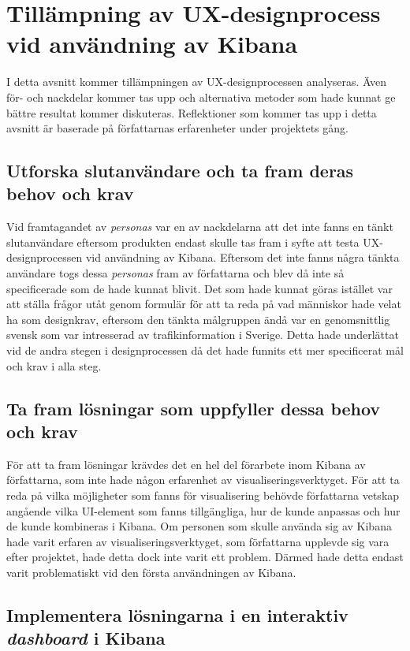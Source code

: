 \documentclass[12pt]{kththesis}
\begin{document}
\section{Tillämpning av UX-designprocess vid användning av Kibana} 
I detta avsnitt kommer tillämpningen av UX-designprocessen analyseras. Även för- och nackdelar kommer tas upp och alternativa metoder som hade kunnat ge bättre resultat kommer diskuteras.  Reflektioner som kommer tas upp i detta avsnitt är baserade på författarnas erfarenheter under projektets gång.

\subsection{Utforska slutanvändare och ta fram deras behov och krav} 
Vid framtagandet av \textit{personas} var en av nackdelarna att det inte fanns en tänkt slutanvändare eftersom produkten endast skulle tas fram i syfte att testa UX-designprocessen vid användning av Kibana. Eftersom det inte fanns några tänkta användare togs dessa \textit{personas} fram av författarna och blev då inte så specificerade som de hade kunnat blivit. Det som hade kunnat göras istället var att ställa frågor utåt genom formulär för att ta reda på vad människor hade velat ha som designkrav, eftersom den tänkta målgruppen ändå var en genomsnittlig svensk som var intresserad av trafikinformation i Sverige. Detta hade underlättat vid de andra stegen i designprocessen då det hade funnits ett mer specificerat mål och krav i alla steg.

\subsection{Ta fram lösningar som uppfyller dessa behov och krav}
För att ta fram lösningar krävdes det en hel del förarbete inom Kibana av författarna, som inte hade någon erfarenhet av visualiseringsverktyget. För att ta reda på vilka möjligheter som fanns för visualisering behövde författarna vetskap angående vilka UI-element som fanns tillgängliga, hur de kunde anpassas och hur de kunde kombineras i Kibana. Om personen som skulle använda sig av Kibana hade varit erfaren av visualiseringsverktyget, som författarna upplevde sig vara efter projektet, hade detta dock inte varit ett problem. Därmed hade detta endast varit problematiskt vid den första användningen av Kibana.

\subsection{Implementera lösningarna i en interaktiv \textit{dashboard} i Kibana}
\end{document}
